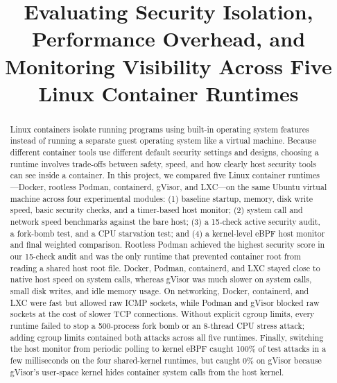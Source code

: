 \documentclass[conference]{IEEEtran}
\begin{document}
\title{Evaluating Security Isolation, Performance Overhead, and Monitoring Visibility Across Five Linux Container Runtimes}

\author{
}

\maketitle

\begin{abstract}
Linux containers isolate running programs using built-in operating system features instead of running a separate guest operating system like a virtual machine. Because different container tools use different default security settings and designs, choosing a runtime involves trade-offs between safety, speed, and how clearly host security tools can see inside a container. In this project, we compared five Linux container runtimes---Docker, rootless Podman, containerd, gVisor, and LXC---on the same Ubuntu virtual machine across four experimental modules: (1) baseline startup, memory, disk write speed, basic security checks, and a timer-based host monitor; (2) system call and network speed benchmarks against the bare host; (3) a 15-check active security audit, a fork-bomb test, and a CPU starvation test; and (4) a kernel-level eBPF host monitor and final weighted comparison. Rootless Podman achieved the highest security score in our 15-check audit and was the only runtime that prevented container root from reading a shared host root file. Docker, Podman, containerd, and LXC stayed close to native host speed on system calls, whereas gVisor was much slower on system calls, small disk writes, and idle memory usage. On networking, Docker, containerd, and LXC were fast but allowed raw ICMP sockets, while Podman and gVisor blocked raw sockets at the cost of slower TCP connections. Without explicit cgroup limits, every runtime failed to stop a 500-process fork bomb or an 8-thread CPU stress attack; adding cgroup limits contained both attacks across all five runtimes. Finally, switching the host monitor from periodic polling to kernel eBPF caught 100\% of test attacks in a few milliseconds on the four shared-kernel runtimes, but caught 0\% on gVisor because gVisor's user-space kernel hides container system calls from the host kernel.
\end{abstract}
\end{document}
